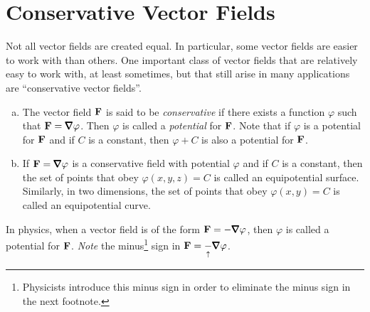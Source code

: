 \section{Conservative Vector Fields}\label{sec:conservativeFields}

Not all vector fields are created equal. In particular, some vector
fields are easier to work with than others. One important class 
of vector fields that are relatively easy to work with, at least sometimes, 
but that still arise in many applications are ``conservative vector fields''. 

\begin{defn}\label{def:conservative}

\begin{enumerate}[(a)]
\item
The vector field $\mathbf{F}$ is said to be \emph{conservative} if there
exists a function $\varphi$ such that $\vF = \vnabla\varphi$. Then
$\varphi$ is called a \emph{potential} for $\mathbf{F}$. Note that if $\varphi$ 
is a potential for $\mathbf{F}$ and if $C$ is a constant, then $\varphi+C$
is also a potential for $\mathbf{F}$.

\item If $\vF=\vnabla\varphi$ is a conservative field with potential 
$\varphi$ and if $C$ is a constant, then the set of points that
obey $\varphi(x,y,z)=C$ is called an equipotential surface.
Similarly, in two dimensions, the set of points that
obey $\varphi(x,y)=C$ is called an equipotential curve.
\end{enumerate}
\end{defn}

\begin{warning}\label{warn:potential}
In physics,  when a vector field is of the form $\vF=-\vnabla\varphi$,
then $\varphi$ is called a potential for $\mathbf{F}$.
\emph{Note} the minus\footnote{Physicists introduce this minus sign in order to eliminate the minus sign in the next footnote.} sign in 
  $\vF=\underset{\uparrow}{-}\vnabla\varphi$. 
\end{warning}

